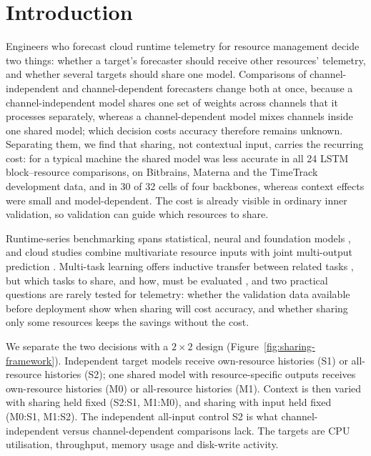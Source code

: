 \documentclass[5p,twocolumn]{elsarticle}
\begin{document}
\section{Introduction}
\label{sec:introduction}

Engineers who forecast cloud runtime telemetry for resource management
\citep{Taherizadeh2018Monitoring,Bauer2020SelfAware} decide two things:
whether a target's forecaster should receive other resources' telemetry, and
whether several targets should share one model. Comparisons of
channel-independent and channel-dependent forecasters
\citep{Han2024ChannelIndependent} change both at once, because a
channel-independent model shares one set of weights across channels that it
processes separately, whereas a channel-dependent model mixes channels inside
one shared model; which decision costs accuracy therefore remains unknown.
Separating them, we find that sharing, not contextual input, carries the
recurring cost: for a typical machine the shared model was less accurate in
all 24 LSTM block--resource comparisons, on Bitbrains, Materna and the
TimeTrack development data, and in 30 of 32 cells of four backbones, whereas
context effects were small and model-dependent. The cost is already visible in ordinary inner
validation, so validation can guide which resources to share.

Runtime-series benchmarking spans statistical, neural and foundation models
\citep{DiMenna2026RuntimeForecasting}, and cloud studies combine multivariate
resource inputs with joint multi-output prediction
\citep{Ullah2023CloudBiLSTM,Tripathi2025MMRP}. Multi-task learning offers
inductive transfer between related tasks \citep{Caruana1997Multitask}, but
which tasks to share, and how, must be evaluated
\citep{Standley2020TaskGrouping,Fifty2021TaskGroupings,Nochumsohn2025MTLinear},
and two practical questions are rarely tested for telemetry: whether the
validation data available before deployment show when sharing will cost
accuracy, and whether sharing only some resources keeps the savings without
the cost.

We separate the two decisions with a $2\times2$ design
(Figure~\ref{fig:sharing-framework}). Independent target models receive
own-resource histories (S1) or all-resource histories (S2); one shared model
with resource-specific outputs receives own-resource histories (M0) or
all-resource histories (M1). Context is then varied with sharing held fixed
(S2:S1, M1:M0), and sharing with input held fixed (M0:S1, M1:S2). The
independent all-input control S2 is what channel-independent versus
channel-dependent comparisons lack. The targets are CPU utilisation,
throughput, memory usage and disk-write activity.
\end{document}

